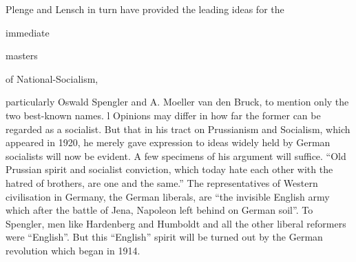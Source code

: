 \documentclass[11pt,openany]{book}
\begin{document}
\begin{center}\textasteriskcentered\hspace{0.9em}\textasteriskcentered\hspace{0.9em}\textasteriskcentered\end{center}

\begin{center}\textasteriskcentered\hspace{0.9em}\textasteriskcentered\hspace{0.9em}\textasteriskcentered\end{center}

\begin{center}\textasteriskcentered\hspace{0.9em}\textasteriskcentered\hspace{0.9em}\textasteriskcentered\end{center}

\begin{center}\textasteriskcentered\hspace{0.9em}\textasteriskcentered\hspace{0.9em}\textasteriskcentered\end{center}

\begin{center}\textasteriskcentered\hspace{0.9em}\textasteriskcentered\hspace{0.9em}\textasteriskcentered\end{center}

Plenge and Lensch in turn have provided the leading ideas for the

immediate

masters

of National-Socialism,

particularly Oswald Spengler and A. Moeller van den Bruck, to mention only the two best-known names. l Opinions may differ in how far the former can be regarded as a socialist. But that in his tract on Prussianism and Socialism, which appeared in 1920, he merely gave expression to ideas widely held by German socialists will now be evident. A few specimens of his argument will suffice. ``Old Prussian spirit and socialist conviction, which today hate each other with the hatred of brothers, are one and the same.'' The representatives of Western civilisation in Germany, the German liberals, are ``the invisible English army which after the battle of Jena, Napoleon left behind on German soil''. To Spengler, men like Hardenberg and Humboldt and all the other liberal reformers were ``English''. But this ``English'' spirit will be turned out by the German revolution which began in 1914.
\end{document}
